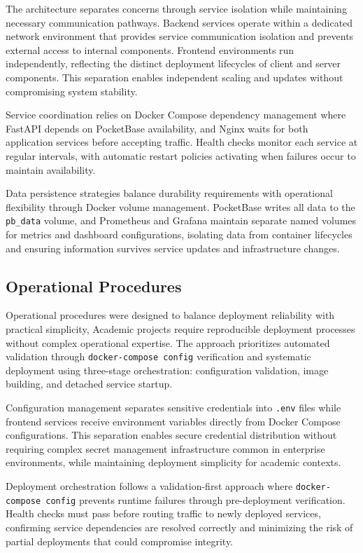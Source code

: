 The architecture separates concerns through service isolation while maintaining necessary communication pathways. Backend services operate within a dedicated network environment that provides service communication isolation and prevents external access to internal components. Frontend environments run independently, reflecting the distinct deployment lifecycles of client and server components. This separation enables independent scaling and updates without compromising system stability.

Service coordination relies on Docker Compose dependency management where FastAPI depends on PocketBase availability, and Nginx waits for both application services before accepting traffic. Health checks monitor each service at regular intervals, with automatic restart policies activating when failures occur to maintain availability.

Data persistence strategies balance durability requirements with operational flexibility through Docker volume management. PocketBase writes all data to the \texttt{pb\_data} volume, and Prometheus and Grafana maintain separate named volumes for metrics and dashboard configurations, isolating data from container lifecycles and ensuring information survives service updates and infrastructure changes.

\subsection{Operational Procedures} \label{subsection:operational_procedures}

Operational procedures were designed to balance deployment reliability with practical simplicity, Academic projects require reproducible deployment processes without complex operational expertise. The approach prioritizes automated validation through \texttt{docker-compose config} verification and systematic deployment using three-stage orchestration: configuration validation, image building, and detached service startup.

Configuration management separates sensitive credentials into \texttt{.env} files while frontend services receive environment variables directly from Docker Compose configurations. This separation enables secure credential distribution without requiring complex secret management infrastructure common in enterprise environments, while maintaining deployment simplicity for academic contexts.

Deployment orchestration follows a validation-first approach where \texttt{docker-compose config} prevents runtime failures through pre-deployment verification. Health checks must pass before routing traffic to newly deployed services, confirming service dependencies are resolved correctly and minimizing the risk of partial deployments that could compromise integrity.

